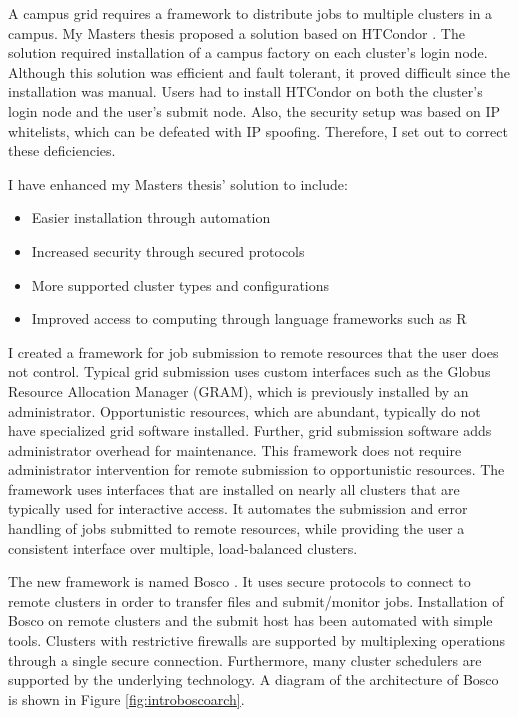 A campus grid requires a framework to distribute jobs to multiple clusters in a campus.  My Masters thesis \cite{weitzel2011campus} proposed a solution based on HTCondor \cite{litzkow1988condor}.  The solution required installation of a campus factory \cite{website:campusfactory} on each cluster's login node.  Although this solution was efficient and fault tolerant, it proved difficult since the installation was manual.  Users had to install HTCondor on both the cluster's login node and the user's submit node.  Also, the security setup was based on IP whitelists, which can be defeated with IP spoofing.  Therefore, I set out to correct these deficiencies.

I have enhanced my Masters thesis' solution to include:
\begin{itemize}
\item Easier installation through automation
\item Increased security through secured protocols
\item More supported cluster types and configurations
\item Improved access to computing through language frameworks such as R \cite{team2005r}
\end{itemize}

I created a framework for job submission to remote resources that the user does not control.  Typical grid submission uses custom interfaces such as the Globus Resource Allocation Manager \cite{foster1999globus} (GRAM), which is previously installed by an administrator.  Opportunistic resources, which are abundant, typically do not have specialized grid software installed.  Further, grid submission software adds administrator overhead for maintenance.  This framework does not require administrator intervention for remote submission to opportunistic resources.  The framework uses interfaces that are installed on nearly all clusters that are typically used for interactive access.  It automates the submission and error handling of jobs submitted to remote resources, while providing the user a consistent interface over multiple, load-balanced clusters.

The new framework is named Bosco \cite{chep2013weitzel}.  It uses secure protocols to connect to remote clusters in order to transfer files and submit/monitor jobs.  Installation of Bosco on remote clusters and the submit host has been automated with simple tools.  Clusters with restrictive firewalls are supported by multiplexing operations through a single secure connection.  Furthermore, many cluster schedulers are supported by the underlying technology.  A diagram of the architecture of Bosco is shown in Figure \ref{fig:introboscoarch}.

